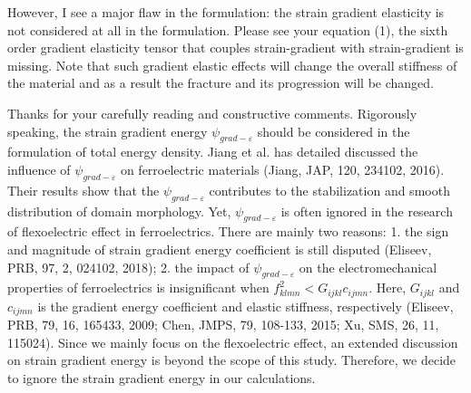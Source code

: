\documentclass[12pt,fleqn]{article}
\begin{document}
\begin{question}{}\label{R2:Q1}
    However, I see a major flaw in the formulation: the strain gradient elasticity is not considered at all in the formulation. Please see your equation (1), the sixth order gradient elasticity tensor that couples strain-gradient with strain-gradient is missing. Note that such gradient elastic effects will change the overall stiffness of the material and as a result the fracture and its progression will be changed.
\end{question}
\begin{response}
    Thanks for your carefully reading and constructive comments. Rigorously speaking, the strain gradient energy $\psi_{grad-\varepsilon}$ should be considered in the formulation of total energy density. Jiang et al. has detailed discussed the influence of $\psi_{grad-\varepsilon}$ on ferroelectric materials (Jiang, JAP, 120, 234102, 2016). Their results show that the $\psi_{grad-\varepsilon}$ contributes to the stabilization and smooth distribution of domain morphology.  Yet, $\psi_{grad-\varepsilon}$ is often ignored in the research of flexoelectric effect in ferroelectrics. There are mainly two reasons: 1. the sign and magnitude of strain gradient energy coefficient is still disputed (Eliseev, PRB, 97, 2, 024102, 2018); 2. the impact of $\psi_{grad-\varepsilon}$ on the electromechanical properties of ferroelectrics is insignificant when $f_{klmn}^2<G_{ijkl} c_{ijmn}$. Here, $G_{ijkl}$ and $c_{ijmn}$ is the gradient energy coefficient and elastic stiffness, respectively (Eliseev, PRB, 79, 16, 165433, 2009; Chen, JMPS, 79, 108-133, 2015; Xu, SMS,  26, 11, 115024). Since we mainly focus on the flexoelectric effect, an extended discussion on strain gradient energy is beyond the scope of this study. Therefore, we decide to ignore the strain gradient energy in our calculations. 


\end{response}
\end{document}
